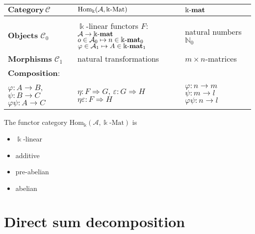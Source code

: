 \documentclass[12pt,compress]{beamer}
\newcommand{\kmat}{\Bbbk\textnormal{-}\mathbf{mat}}
\newcommand{\HomAkmat}{\mathrm{Hom}_{\Bbbk}(\mathcal{A},\Bbbk\textnormal{-}\mathrm{Mat})}
\begin{document}
\begin{frame}[fragile]
\begin{tabular}{p{}p{}p{}}
$\mathbf{Category}\,\mathcal{C}$ & $\HomAkmat$ & $\kmat$ \\
\hline \\
\textbf{Objects} $\mathcal{C}_{0}$ & \makecell[l]{$\Bbbk$-linear functors $F :$\\ $\mathcal{A} \rightarrow \kmat$ \\ $o \in \mathcal{A}_{0} \mapsto n \in \kmat_{0}$ \\ $\varphi \in \mathcal{A}_{1} \mapsto A \in \kmat_{1}$} & natural numbers $\mathbb{N}_{0}$ \\
\textbf{Morphisms} $\mathcal{C}_{1}$ & natural transformations & $m\times n$-matrices \\
\textbf{Composition}: & & \\
\makecell[l]{$\varphi : A \rightarrow B$, \\$\psi : B \rightarrow C$ \\ $\varphi\psi : A \rightarrow C$} & \makecell[l]{$\eta : F \Rightarrow G$,\\ $\varepsilon : G \Rightarrow H$ \\ $\eta\varepsilon : F \Rightarrow H$} & \makecell[l]{$\varphi : n \rightarrow m\qquad$ \\ $\psi : m \rightarrow l\qquad$ \\ $\varphi\psi : n \rightarrow l$}
\end{tabular}
\end{frame}

\begin{frame}[fragile]
The functor category $\mathrm{Hom}_{\Bbbk}(\mathcal{A},\Bbbk\text{-}\mathrm{Mat})$ is
\begin{itemize}[<+->]
\item $\Bbbk$-linear
\item additive
\item pre-abelian
\item abelian
\end{itemize}
\end{frame}







\section{Direct sum decomposition}
\end{document}

